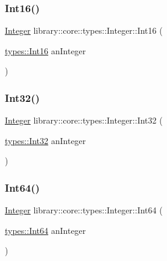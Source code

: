 \mbox{\label{classlibrary_1_1core_1_1types_1_1_integer_ae91520c03f3f2455580c98ffdc431a5f}} 
\subsubsection{\texorpdfstring{Int16()}{Int16()}}
{\footnotesize\ttfamily \mbox{\hyperlink{classlibrary_1_1core_1_1types_1_1_integer}{Integer}} library\+::core\+::types\+::\+Integer\+::\+Int16 (\begin{DoxyParamCaption}\item[{\mbox{\hyperlink{namespacelibrary_1_1core_1_1types_a150247fa2cd1b258b8e5950efcaecfc9}{types\+::\+Int16}}}]{an\+Integer }\end{DoxyParamCaption})\hspace{0.3cm}{\ttfamily [static]}}

\mbox{\label{classlibrary_1_1core_1_1types_1_1_integer_a3adfbe3b3972643d486a2a8f781a5d9f}} 
\subsubsection{\texorpdfstring{Int32()}{Int32()}}
{\footnotesize\ttfamily \mbox{\hyperlink{classlibrary_1_1core_1_1types_1_1_integer}{Integer}} library\+::core\+::types\+::\+Integer\+::\+Int32 (\begin{DoxyParamCaption}\item[{\mbox{\hyperlink{namespacelibrary_1_1core_1_1types_acaf2598d96f2239dc55e54628da77876}{types\+::\+Int32}}}]{an\+Integer }\end{DoxyParamCaption})\hspace{0.3cm}{\ttfamily [static]}}

\mbox{\label{classlibrary_1_1core_1_1types_1_1_integer_a24c417fe94624194efd4d3ffc301c0b3}} 
\subsubsection{\texorpdfstring{Int64()}{Int64()}}
{\footnotesize\ttfamily \mbox{\hyperlink{classlibrary_1_1core_1_1types_1_1_integer}{Integer}} library\+::core\+::types\+::\+Integer\+::\+Int64 (\begin{DoxyParamCaption}\item[{\mbox{\hyperlink{namespacelibrary_1_1core_1_1types_aaa5045e0d51ac9cff3c0aeff2b792c8c}{types\+::\+Int64}}}]{an\+Integer }\end{DoxyParamCaption})\hspace{0.3cm}{\ttfamily [static]}}

